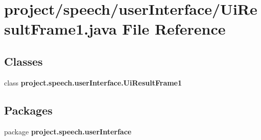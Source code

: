 \section{project/speech/user\+Interface/\+Ui\+Result\+Frame1.java File Reference}
\label{_ui_result_frame1_8java}
\subsection*{Classes}
\begin{DoxyCompactItemize}
\item 
class {\bf project.\+speech.\+user\+Interface.\+Ui\+Result\+Frame1}
\end{DoxyCompactItemize}
\subsection*{Packages}
\begin{DoxyCompactItemize}
\item 
package {\bf project.\+speech.\+user\+Interface}
\end{DoxyCompactItemize}
